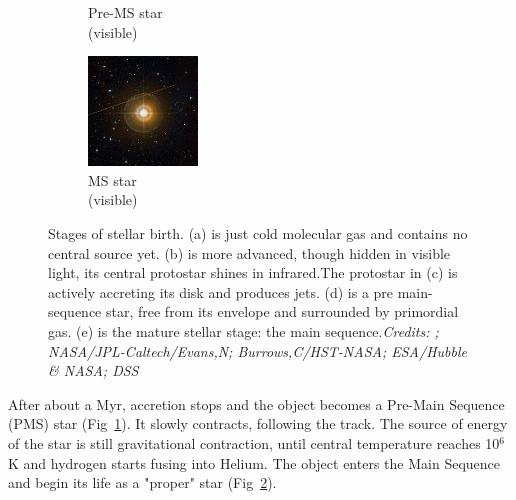 \begin{figure}
\begin{subfigure}[b]{0.19\textwidth}
        \caption{Pre-MS star \\ \centering (visible)}
        \label{Fig:0_proto_4}
    \end{subfigure}  
        \begin{subfigure}[b]{0.19\textwidth}
        \includegraphics[width=\textwidth]{Figures/0_proto_5.jpg}
        \caption{MS star \\\centering (visible) }
        \label{Fig:0_proto_5}
    \end{subfigure}
     \caption{Stages of stellar birth. (a) is just cold molecular gas and contains no central source yet. (b) is more advanced, though hidden in visible light, its central protostar shines in infrared.The protostar in (c) is actively accreting its disk and produces jets. (d) is a pre main-sequence star, free from its envelope and surrounded by primordial gas. (e) is the mature stellar stage: the main sequence.\textit{Credits: \protect\cite{Kandori2005}; NASA/JPL-Caltech/Evans,N; Burrows,C/HST-NASA; ESA/Hubble \& NASA; DSS}}
     \label{Fig:0_protoevolution}
\end{figure}





After about a Myr, accretion stops and the object becomes a Pre-Main Sequence (PMS) star (Fig~\ref{Fig:0_proto_4}). It slowly contracts, following the \cite{Hayashi1961} track. The source of energy of the star is still gravitational contraction, until central temperature reaches 10$^6$K and hydrogen starts fusing into Helium. The  object enters the Main Sequence and begin its life as a "proper" star (Fig~\ref{Fig:0_proto_5}).


